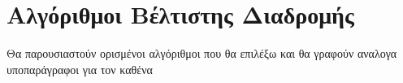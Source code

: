 \section{Αλγόριθμοι Βέλτιστης Διαδρομής}
Θα παρουσιαστούν ορισμένοι αλγόριθμοι που θα επιλέξω και θα γραφούν αναλογα υποπαράγραφοι για τον καθένα